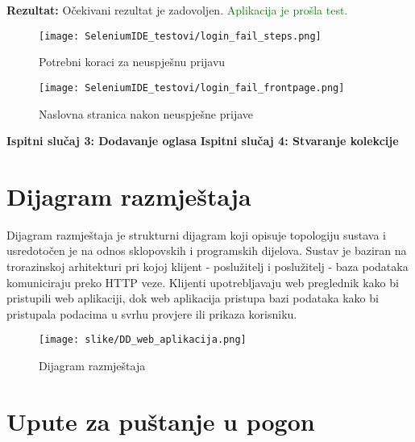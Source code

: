 				\noindent\textbf{Rezultat:} Očekivani rezultat je zadovoljen. \textcolor{green}{Aplikacija je prošla test.}
				
				\begin{figure}[H]
					\texttt{[image: SeleniumIDE\_testovi/login\_fail\_steps.png]}
					\centering
					\caption{Potrebni koraci za neuspješnu prijavu}
					\label{fig:login_steps}
				\end{figure}
				
				\begin{figure}[H]
					\texttt{[image: SeleniumIDE\_testovi/login\_fail\_frontpage.png]}
					\centering
					\caption{Naslovna stranica nakon neuspješne prijave}
					\label{fig:login_home_page}
				\end{figure}
				
				\noindent\textbf{Ispitni slučaj 3: Dodavanje oglasa}
				\noindent\textbf{Ispitni slučaj 4: Stvaranje kolekcije}
			
			\eject 
		
		
		\section{Dijagram razmještaja}
			
%			

		Dijagram razmještaja je strukturni dijagram koji opisuje topologiju sustava i usredotočen je na odnos sklopovskih i programskih dijelova. Sustav je baziran na trorazinskoj arhitekturi pri kojoj klijent - poslužitelj i poslužitelj - baza podataka komuniciraju preko HTTP veze. Klijenti upotrebljavaju web preglednik kako bi pristupili web aplikaciji, dok web aplikacija pristupa bazi podataka kako bi pristupala podacima u svrhu provjere ili prikaza korisniku.

				\begin{figure}[H]
					\texttt{[image: slike/DD\_web\_aplikacija.png]}
					\centering
					\caption{Dijagram razmještaja}
					\label{fig:dig_razmjestaja}
				\end{figure}
			
			\eject 
		
		\section{Upute za puštanje u pogon}
		
